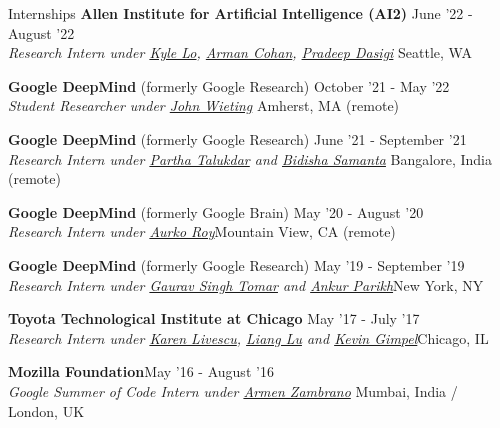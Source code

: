 \documentclass{resume} %
\begin{document}
\begin{rSection}{Internships}
\vspace*{0.1in}
{\bf Allen Institute for Artificial Intelligence (AI2)} { \hfill June '22 - August '22}\\ \textit{Research Intern under \href{https://kyleclo.github.io/}{Kyle Lo}, \href{http://armancohan.com/}{Arman Cohan}, \href{https://pdasigi.github.io/}{Pradeep Dasigi}} {\hfill Seattle, WA}

{\bf Google DeepMind} (formerly Google Research) { \hfill October '21 - May '22}\\ \textit{Student Researcher under \href{https://scholar.google.com/citations?user=Z0dGdDUAAAAJ&hl=en}{John Wieting}} {\hfill Amherst, MA (remote)}

{\bf Google DeepMind} (formerly Google Research) { \hfill June '21 - September '21}\\ \textit{Research Intern under \href{https://scholar.google.com/citations?user=CIZwXAcAAAAJ&hl=en}{Partha Talukdar} and \href{https://sites.google.com/view/bidisha-samanta/}{Bidisha Samanta}} {\hfill Bangalore, India (remote)}

{\bf Google DeepMind} (formerly Google Brain) { \hfill May '20 - August '20}\\ \textit{Research Intern under \href{https://sites.google.com/site/royaurko/}{Aurko Roy}}{\hfill Mountain View, CA (remote)}

{\bf Google DeepMind} (formerly Google Research) { \hfill May '19 - September '19}\\ \textit{Research Intern under \href{https://ai.google/research/people/GauravSinghTomar/}{Gaurav Singh Tomar} and \href{www.ankurparikh.com}{Ankur Parikh}}{\hfill New York, NY}

{\bf Toyota Technological Institute at Chicago}{ \hfill May '17 - July '17}\\ \textit{Research Intern under \href{http://ttic.uchicago.edu/~klivescu/}{Karen Livescu}, \href{http://ttic.uchicago.edu/~llu/}{Liang Lu} and \href{http://ttic.uchicago.edu/~kgimpel/}{Kevin Gimpel}}{\hfill Chicago, IL}

{\bf Mozilla Foundation}{\hfill May '16 - August '16} \\ \textit{Google Summer of Code Intern under \href{https://github.com/armenzg}{Armen Zambrano}}{ \hfill Mumbai, India / London, UK}
\end{rSection}

\pagebreak
\end{document}
